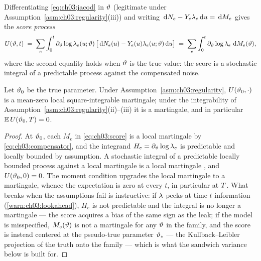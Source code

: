 Differentiating \cref{eq:ch03:jacod} in $\vartheta$ (legitimate under
Assumption~\ref{asm:ch03:regularity}(iii)) and writing
$\,\mathrm{d} N_e - Y_e \lambda_e \,\mathrm{d} u = \,\mathrm{d} M_e$ gives the \emph{score
process}
\begin{equation}\label{eq:ch03:score}
U(\vartheta, t)
 \;=\;
 \sum_{e} \int_0^{t} \partial_{\vartheta} \log \lambda_e(u;\vartheta)
 \,\big[\,\mathrm{d} N_e(u) - Y_e(u)\lambda_e(u;\vartheta)\,\mathrm{d} u\big]
 \;=\;
 \sum_{e} \int_0^{t} \partial_{\vartheta} \log \lambda_e \,\,\mathrm{d} M_e(\vartheta),
\end{equation}
where the second equality holds when $\vartheta$ is the true value: the
score is a stochastic integral of a predictable process against the
compensated noise.

\begin{proposition}\label{prop:ch03:score}
Let $\vartheta_0$ be the true parameter. Under
Assumption~\ref{asm:ch03:regularity}, $U(\vartheta_0,\cdot)$ is a mean-zero
local square-integrable martingale; under the integrability of
Assumption~\ref{asm:ch03:regularity}(ii)--(iii) it is a martingale, and in
particular
$\mathbb{E}\,U(\vartheta_0,T) = 0$.
\end{proposition}

\begin{proof}
At $\vartheta_0$, each $M_e$ in \cref{eq:ch03:score} is a local
martingale by \cref{eq:ch03:compensator}, and the integrand
$H_e = \partial_{\vartheta}\log\lambda_e$ is predictable and locally
bounded by assumption. A stochastic integral of a predictable locally
bounded process against a local martingale is a local martingale
\citep[Ch.~II]{abgk1993}, and $U(\vartheta_0,0)=0$. The moment
condition upgrades the local martingale to a martingale, whence the
expectation is zero at every $t$, in particular at $T$. What breaks
when the assumptions fail is instructive: if $\lambda$ peeks at time-$t$
information (\cref{warn:ch03:lookahead}), $H_e$ is not predictable and the
integral is no longer a martingale --- the score acquires a bias of the
same sign as the leak; if the model is misspecified, $M_e(\vartheta)$ is
not a martingale for any $\vartheta$ in the family, and the score is
instead centered at the pseudo-true parameter $\vartheta_*$ --- the
Kullback--Leibler projection of the truth onto the family --- which is
what the sandwich variance below is built for.
\end{proof}

